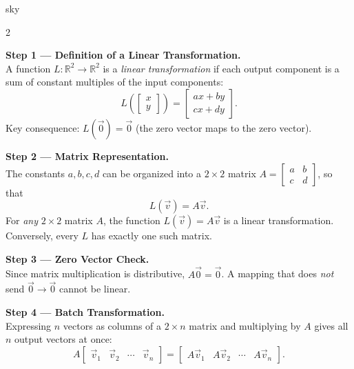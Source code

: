 \documentclass[10pt]{article}
\begin{document}
\begin{skillbox}[Lesson]{sky}
\begin{multicols}{2}

\textbf{Step 1 --- Definition of a Linear Transformation.}\\
A function $L:\mathbb{R}^2\to\mathbb{R}^2$ is a \emph{linear transformation} if each
output component is a sum of constant multiples of the input components:
\[
  L\!\left(\begin{bmatrix}x\\y\end{bmatrix}\right)
  = \begin{bmatrix}ax+by\\cx+dy\end{bmatrix}.
\]
Key consequence: $L(\vec{0}) = \vec{0}$ (the zero vector maps to the zero vector).

\vspace{6pt}
\textbf{Step 2 --- Matrix Representation.}\\
The constants $a,b,c,d$ can be organized into a $2\times 2$ matrix
$A = \begin{bmatrix}a & b \\ c & d\end{bmatrix}$, so that
\[
  L(\vec{v}) = A\vec{v}.
\]
For \emph{any} $2\times 2$ matrix $A$, the function $L(\vec{v})=A\vec{v}$ is a linear
transformation.  Conversely, every $L$ has exactly one such matrix.

\vspace{6pt}
\textbf{Step 3 --- Zero Vector Check.}\\
Since matrix multiplication is distributive, $A\vec{0} = \vec{0}$.  A mapping that does
\emph{not} send $\vec{0}\to\vec{0}$ cannot be linear.

\columnbreak

\textbf{Step 4 --- Batch Transformation.}\\
Expressing $n$ vectors as columns of a $2\times n$ matrix and multiplying by $A$ gives
all $n$ output vectors at once:
\[
  A\begin{bmatrix}\vec{v}_1 & \vec{v}_2 & \cdots & \vec{v}_n\end{bmatrix}
  = \begin{bmatrix}A\vec{v}_1 & A\vec{v}_2 & \cdots & A\vec{v}_n\end{bmatrix}.
\]


\end{multicols}
\end{skillbox}
\end{document}
